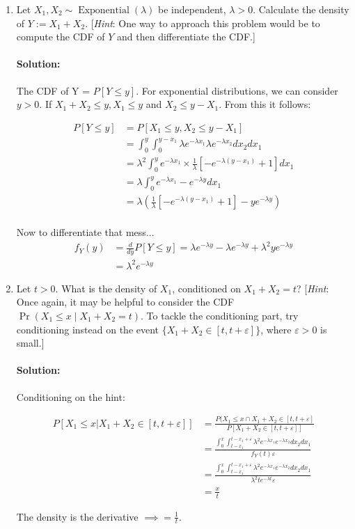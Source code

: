 \documentclass[11pt, notitlepage]{article}
\newenvironment{solution}{\paragraph{Solution:}}{\hfill \vspace{10mm}}
\begin{document}
\begin{enumerate}[label=\alph*.)]
    \item Let $X_1, X_2 \sim \operatorname{Exponential}(\lambda)$ be independent, $\lambda > 0$.
    Calculate the density of $Y := X_1 + X_2$.
    [\textit{Hint}: One way to approach this problem would be to compute the CDF of $Y$ and then differentiate the CDF.]
    \begin{solution} The CDF of Y = $P[Y\leq y]$.
    	For exponential distributions, we can consider $y > 0$. If $X_1 + X_2 \leq y, X_1 \leq y$ and $X_2 \leq y-X_1$. From this it follows:
    	
    	$$\begin{aligned}
    		P[Y\leq y] &= P[X_1 \leq y, X_2 \leq y-X_1] \\
    		&=\int_{0}^{y}\int_{0}^{y-x_1}{\lambda e^{-\lambda x_1} \lambda e^{-\lambda x_2} dx_2 dx_1} \\
    		&=\lambda^2\int_{0}^{y}{ e^{-\lambda x_1} \times \frac{1}{\lambda}[-e^{-\lambda (y-x_1)} + 1]  dx_1} \\
    		&=\lambda\int_{0}^{y}{e^{-\lambda x_1} - e^{-\lambda y} dx_1} \\
    		&=\lambda \left( \frac{1}{\lambda}[-e^{-\lambda (y-x_1)} + 1] - ye^{-\lambda y}\right) \\
    	\end{aligned}$$
    	
    	Now to differentiate that mess...
    	 $$\begin{aligned}
    	f_Y(y)&=\frac{d}{dy}P[Y\leq y]= \lambda e^{-\lambda y}-\lambda e^{-\lambda y}+\lambda^2 ye^{-\lambda y}\\
    	&=\lambda^2 e^{-\lambda y}
    	 \end{aligned}$$

    \end{solution}
    \item Let $t > 0$.
    What is the density of $X_1$, conditioned on $X_1 + X_2 = t$?
    [\textit{Hint}: Once again, it may be helpful to consider the CDF $\Pr(X_1 \le x \mid X_1 + X_2 = t)$.
    To tackle the conditioning part, try conditioning instead on the event $\{X_1 + X_2 \in [t, t + \varepsilon]\}$, where $\varepsilon > 0$ is small.]
    \begin{solution}
    	Conditioning on the hint:
    	
    	$$\begin{aligned}
    		P[X_1\leq x | X_1 + X_2 \in [t, t + \varepsilon]]&=\frac{P(X_1\leq x\cap X_1 + X_2 \in [t, t + \varepsilon]}{P[X_1 + X_2 \in [t, t + \varepsilon]]} \\
    		&=\frac{\int_{0}^{x}\int_{t-x_1}^{t-x_1+\varepsilon}{\lambda^2e^{-\lambda x_1}e^{-\lambda x_2}dx_2dx_1}}{f_Y(t) \varepsilon}\\
    		&=\frac{\int_{0}^{x}\int_{t-x_1}^{t-x_1+\varepsilon}{\lambda^2e^{-\lambda x_1}e^{-\lambda x_2}dx_2dx_1}}{\lambda^2te^{-\lambda t}\varepsilon}\\
    		&=\frac{x}{t}
    	\end{aligned}$$
    	
    	The density is the derivative $\implies = \frac{1}{t}$.
    \end{solution}
\end{enumerate}
\end{document}

